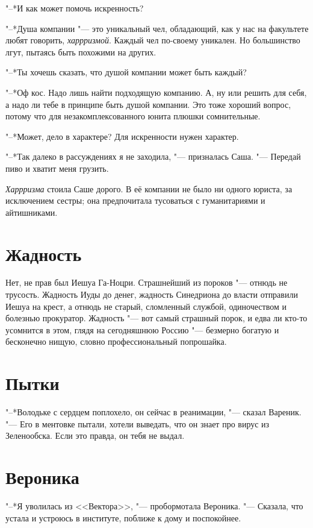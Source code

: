 "--*И как может помочь искренность?

"--*Душа компании "--- это уникальный чел, обладающий, как у нас на факультете любят говорить, \emph{харрризмой}.
Каждый чел по-своему уникален.
Но большинство лгут, пытаясь быть похожими на других.

"--*Ты хочешь сказать, что душой компании может быть каждый?

"--*Оф кос.
Надо лишь найти подходящую компанию.
А, ну или решить для себя, а надо ли тебе в принципе быть душой компании.
Это тоже хороший вопрос, потому что для незакомплексованного юнита плюшки сомнительные.

"--*Может, дело в характере?
Для искренности нужен характер.

"--*Так далеко в рассуждениях я не заходила, "--- призналась Саша.
"--- Передай пиво и хватит меня грузить.

\emph{Харрризма} стоила Саше дорого.
В её компании не было ни одного юриста, за исключением сестры;
она предпочитала тусоваться с гуманитариями и айтишниками.

\section{Жадность}

Нет, не прав был Иешуа Га-Ноцри.
Страшнейший из пороков "--- отнюдь не трусость. 
Жадность Иуды до денег, жадность Синедриона до власти отправили Иешуа на крест, а отнюдь не старый, сломленный службой, одиночеством и болезнью прокуратор.
Жадность "--- вот самый страшный порок, и едва ли кто-то усомнится в этом, глядя на сегодняшнюю Россию "--- безмерно богатую и бесконечно нищую, словно профессиональный попрошайка.

\section{Пытки}

"--*Володьке с сердцем поплохело, он сейчас в реанимации, "--- сказал Вареник.
"--- Его в ментовке пытали, хотели выведать, что он знает про вирус из Зеленообска.
Если это правда, он тебя не выдал.

\section{Вероника}

"--*Я уволилась из <<Вектора>>, "--- пробормотала Вероника.
"--- Сказала, что устала и устроюсь в институте, поближе к дому и поспокойнее.

